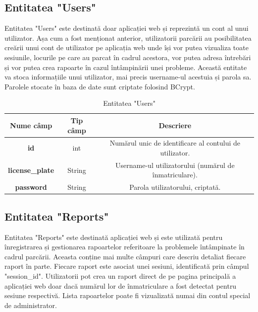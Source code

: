 \documentclass[12pt]{article}
\begin{document}
\subsection{Entitatea "Users"}

Entitatea "Users" este destinat\u{a} doar aplicației web și reprezint\u{a} un cont al unui utilizator. Așa cum a fost menționat anterior, utilizatorii parc\u{a}rii au posibilitatea cre\u{a}rii unui cont de utilizator pe aplicația web unde \^{i}și vor putea vizualiza toate sesiunile, locurile pe care au parcat \^{i}n cadrul acestora, vor putea adresa \^{i}ntreb\u{a}ri și vor putea crea rapoarte \^{i}n cazul \^{i}nt\^{a}mpin\u{a}rii unei probleme. Aceast\u{a} entitate va stoca informațiile unui utilizator, mai precis username-ul acestuia și parola sa. Parolele stocate \^{i}n baza de date sunt criptate folosind BCrypt.

\begin{table}[h]
\centering
\begin{tabular}{|c|c|c|}
\hline
\textbf{Nume c\^{a}mp}  & \textbf{Tip c\^{a}mp} & \textbf{Descriere} \\
\hline
\textbf{id} & int & Num\u{a}rul unic de identificare al contului de utilizator.  \\
\hline
\textbf{license\_plate} & String & Username-ul utilizatorului (num\u{a}rul de \^{i}nmatriculare). \\
\hline
\textbf{password} & String & Parola utilizatorului, criptat\u{a}.  \\
\hline
\end{tabular}
\caption{Entitatea "Users"}
\end{table}

\subsection{Entitatea "Reports"}

Entitatea "Reports" este destinat\u{a} aplicației web și este utilizat\u{a} pentru \^{i}nregistrarea și gestionarea rapoartelor referitoare la problemele \^{i}nt\^{a}mpinate \^{i}n cadrul parc\u{a}rii. Aceasta conține mai multe câmpuri care descriu detaliat fiecare raport în parte. Fiecare raport este asociat unei sesiuni, identificat\u{a} prin c\^{a}mpul "session\_id". Utilizatorii pot crea un raport direct de pe pagina principal\u{a} a aplicației web doar dac\u{a} num\u{a}rul lor de \^{i}nmatriculare a fost detectat pentru sesiune respectiv\u{a}. Lista rapoartelor poate fi vizualizat\u{a} numai din contul special de administrator.
\end{document}
